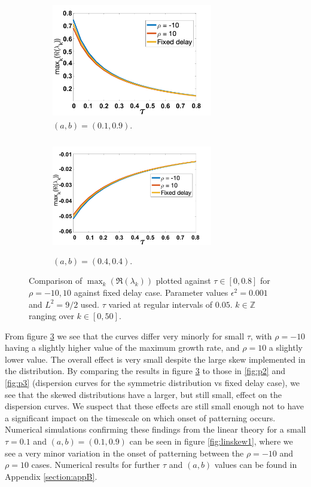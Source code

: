 \begin{figure}[H]
    \centering
    \begin{subfigure}[t]{0.45\textwidth}
        \centering
        \includegraphics[width=7cm,height=5cm]{dispskew.png}
        \caption{$(a,b)=(0.1,0.9)$.}
        \label{}
    \end{subfigure}
    \hfill
    \begin{subfigure}[t]{0.45\textwidth}
        \centering
        \includegraphics[width=7cm,height=5cm]{dispskew2.png}
        \caption{$(a,b)=(0.4,0.4)$.}
        \label{}
    \end{subfigure}
    \caption{Comparison of $\max_k(\Re(\lambda_k))$ plotted against $\tau\in[0,0.8]$ for $\rho=-10,10$ against fixed delay case. Parameter values $\epsilon^2=0.001$ and $L^2=9/2$ used. $\tau$ varied at regular intervals of $0.05$. $k\in\mathbb{Z}$ ranging over $k\in[0,50]$.}
    \label{fig:dispskew}
\end{figure}
From figure \ref{fig:dispskew} we see that the curves differ very minorly for small $\tau$, with $\rho=-10$ having a slightly higher value of the maximum growth rate, and $\rho=10$ a slightly lower value. The overall effect is very small despite the large skew implemented in the distribution. By comparing the results in figure \ref{fig:dispskew} to those in \ref{fig:p2} and \ref{fig:p3} (dispersion curves for the symmetric distribution vs fixed delay case), we see that the skewed distributions have a larger, but still small, effect on the dispersion curves. We suspect that these effects are still small enough not to have a significant impact on the timescale on which onset of patterning occurs. Numerical simulations confirming these findings from the linear theory for a small $\tau=0.1$ and $(a,b)=(0.1,0.9)$ can be seen in figure \ref{fig:linskew1}, where we see a very minor variation in the onset of patterning between the $\rho=-10$ and $\rho=10$ cases. Numerical results for further $\tau$ and $(a,b)$ values can be found in Appendix \ref{section:appB}.

